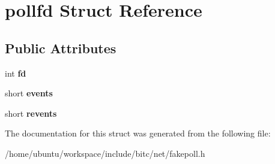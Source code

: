 \hypertarget{structpollfd}{\section{pollfd Struct Reference}
\label{structpollfd}
}
\subsection*{Public Attributes}
\begin{DoxyCompactItemize}
\item 
\hypertarget{structpollfd_a57e1c316fb063e468d680b6246147861}{int {\bfseries fd}}\label{structpollfd_a57e1c316fb063e468d680b6246147861}

\item 
\hypertarget{structpollfd_ac9b2f2c5b1f9a7487eb57e67cd4960ef}{short {\bfseries events}}\label{structpollfd_ac9b2f2c5b1f9a7487eb57e67cd4960ef}

\item 
\hypertarget{structpollfd_aafb457d11cac415faf0e1e2b825118c2}{short {\bfseries revents}}\label{structpollfd_aafb457d11cac415faf0e1e2b825118c2}

\end{DoxyCompactItemize}


The documentation for this struct was generated from the following file\-:\begin{DoxyCompactItemize}
\item 
/home/ubuntu/workspace/include/bitc/net/fakepoll.\-h\end{DoxyCompactItemize}
